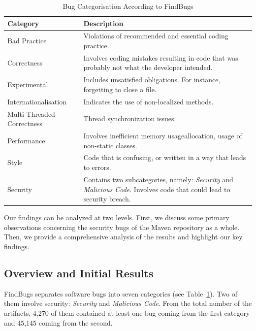 \documentclass[conference]{IEEEtran}
\begin{document}
\begin{table}
\centering
\caption{Bug Categorisation According to FindBugs}
\label{tbl:bug-cat}
\begin{tabular}{l p{15em}}
\hline
Category & Description\\
\hline
Bad Practice & Violations of recommended and essential
coding practice. \\
Correctness & Involves coding mistakes resulting in code
that was probably not what the developer intended. \\
Experimental & Includes unsatisfied obligations. For instance,
forgetting to close a file. \\
Internationalisation & Indicates the use of non-localized methods. \\
Multi-Threaded Correctness & Thread synchronization issues. \\
Performance & Involves inefficient memory usageallocation, usage 
of non-static classes. \\
Style & Code that is confusing, or
written in a way that leads to errors.\\
Security & Contains two subcategories, namely: {\it Security} and {\it
Malicious Code}. Involves code that could lead to security breach. \\
\hline
\end{tabular}
\end{table}

Our findings can be analyzed at two levels. First, we discuss some
primary observations concerning the security bugs of the Maven repository as a whole.
Then, we provide a comprehensive analysis of the results and highlight our key findings.

\subsection{Overview and Initial Results}
\label{sec:overview}

FindBugs separates software bugs into seven categories (see
Table~\ref{tbl:bug-cat}). Two of them involve security: {\it Security} and {\it
Malicious Code}. From the total number of the artifacts, 4,270 of them contained
at least one bug coming from the first category
and 45,145 coming from the second.
\end{document}
